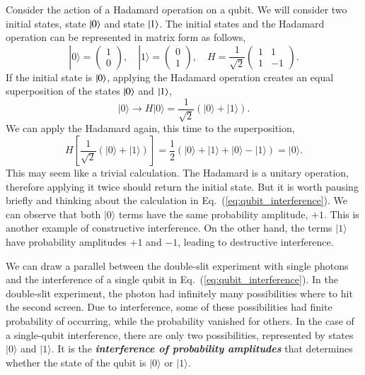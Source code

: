 Consider the action of a Hadamard operation on a qubit.
We will consider two initial states, state $\left| 0 \right\rangle$ and state $\left| 1 \right\rangle$.
The initial states and the Hadamard operation can be represented in matrix form as follows,
\begin{equation}
    |0\rangle = \begin{pmatrix} 1 \\ 0 \end{pmatrix}, \quad
    |1\rangle = \begin{pmatrix} 0 \\ 1 \end{pmatrix}, \quad
    H = \frac{1}{\sqrt{2}} \begin{pmatrix} 1 & 1 \\ 1 & -1 \end{pmatrix}.
\end{equation}
If the initial state is $\left| 0 \right\rangle$, applying the Hadamard operation creates an equal superposition of the states $\left| 0 \right\rangle$ and $\left| 1 \right\rangle$,
\begin{equation}
    |0\rangle \longrightarrow H|0\rangle=\frac{1}{\sqrt{2}}(|0\rangle+|1\rangle).
\end{equation}
We can apply the Hadamard again, this time to the superposition,
\begin{equation}
    H\left[\frac{1}{\sqrt{2}}(|0\rangle+|1\rangle)\right] = \frac{1}{2}(|0\rangle+|1\rangle+|0\rangle-|1\rangle) = |0\rangle.
    \label{eq:qubit_interference}
\end{equation}
This may seem like a trivial calculation.
The Hadamard is a unitary operation, therefore applying it twice should return the initial state.
But it is worth pausing briefly and thinking about the calculation in Eq.~(\ref{eq:qubit_interference}).
We can observe that both $|0\rangle$ terms have the same probability amplitude, $+1$.
This is another example of constructive interference.
On the other hand, the terms $|1\rangle$ have probability amplitudes $+1$ and $-1$, leading to destructive interference.

We can draw a parallel between the double-slit experiment with single photons and the interference of a single qubit in Eq.~(\ref{eq:qubit_interference}).
In the double-slit experiment, the photon had infinitely many possibilities where to hit the second screen.
Due to interference, some of these possibilities had finite probability of occurring, while the probability vanished for others.
In the case of a single-qubit interference, there are only two possibilities, represented by states $|0\rangle$ and $|1\rangle$.
It is the \textbf{\emph{interference of probability amplitudes}} that determines whether the state of the qubit is $|0\rangle$ or $|1\rangle$.

